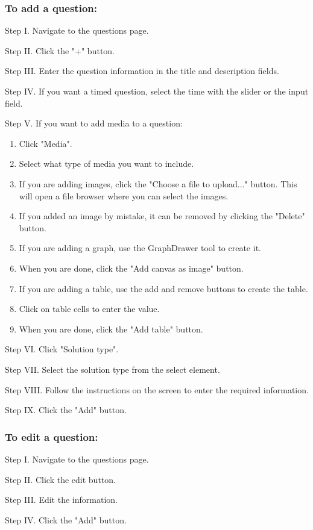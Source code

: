 \subsubsection{To add a question:}
\begin{userManualItemlist}
    \item[Step I.] Navigate to the questions page.
    \item[Step II.] Click the "+" button.
    \item[Step III.] Enter the question information in the title and description fields.
    \item[Step IV.] If you want a timed question, select the time with the slider or the input field.
    \item[Step V.] If you want to add media to a question:
    \begin{enumerate}
        \item Click "Media".
        \item Select what type of media you want to include.
        \item If you are adding images, click the "Choose a file to upload..." button. This will open a file browser where you can select the images.
        \item If you added an image by mistake, it can be removed by clicking the "Delete" button.
        \item If you are adding a graph, use the GraphDrawer tool to create it.
        \item When you are done, click the "Add canvas as image" button.
        \item If you are adding a table, use the add and remove buttons to create the table.
        \item Click on table cells to enter the value.
        \item When you are done, click the "Add table" button.
    \end{enumerate}
    \item[Step VI.] Click "Solution type".
    \item[Step VII.] Select the solution type from the select element.
    \item[Step VIII.] Follow the instructions on the screen to enter the required information.
    \item[Step IX.] Click the "Add" button. 
\end{userManualItemlist}

\subsubsection{To edit a question:}
\begin{userManualItemlist}
    \item[Step I.] Navigate to the questions page.
    \item[Step II.] Click the edit button.
    \item[Step III.] Edit the information.
    \item[Step IV.] Click the "Add" button.  
\end{userManualItemlist}
